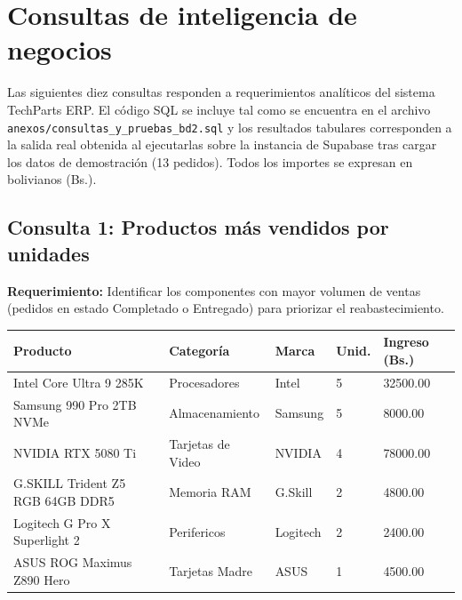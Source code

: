 
\section{Consultas de inteligencia de negocios}

Las siguientes diez consultas responden a requerimientos analíticos del sistema TechParts ERP.
El código SQL se incluye tal como se encuentra en el archivo \texttt{anexos/consultas\_y\_pruebas\_bd2.sql} y los resultados tabulares corresponden a la salida real obtenida al ejecutarlas sobre la instancia de Supabase tras cargar los datos de demostración (13 pedidos).
Todos los importes se expresan en bolivianos (Bs.).

\subsection{Consulta 1: Productos más vendidos por unidades}

\textbf{Requerimiento:} Identificar los componentes con mayor volumen de ventas (pedidos en estado Completado o Entregado) para priorizar el reabastecimiento.



\begin{center}
\label{tab:q1}
\begin{tablaAPA}
\begin{tabular}{L{4.6cm} L{3.2cm} L{1.9cm} R{1.5cm} R{2.7cm}}
\toprule
\textbf{Producto} & \textbf{Categoría} & \textbf{Marca} & \textbf{Unid.} & \textbf{Ingreso (Bs.)} \\
\midrule
Intel Core Ultra 9 285K & Procesadores & Intel & 5 & 32500.00 \\
Samsung 990 Pro 2TB NVMe & Almacenamiento & Samsung & 5 & 8000.00 \\
NVIDIA RTX 5080 Ti & Tarjetas de Video & NVIDIA & 4 & 78000.00 \\
G.SKILL Trident Z5 RGB 64GB DDR5 & Memoria RAM & G.Skill & 2 & 4800.00 \\
Logitech G Pro X Superlight 2 & Perifericos & Logitech & 2 & 2400.00 \\
ASUS ROG Maximus Z890 Hero & Tarjetas Madre & ASUS & 1 & 4500.00 \\
\bottomrule
\end{tabular}
\end{tablaAPA}
\end{center}

